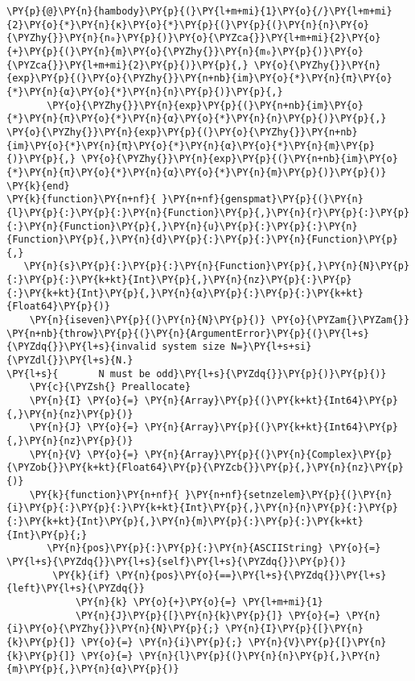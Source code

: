 \begin{Verbatim}[commandchars=\\\{\}]
    \PY{p}{@}\PY{n}{hambody}\PY{p}{(}\PY{l+m+mi}{1}\PY{o}{/}\PY{l+m+mi}{2}\PY{o}{*}\PY{n}{κ}\PY{o}{*}\PY{p}{(}\PY{p}{(}\PY{n}{n}\PY{o}{\PYZhy{}}\PY{n}{n₀}\PY{p}{)}\PY{o}{\PYZca{}}\PY{l+m+mi}{2}\PY{o}{+}\PY{p}{(}\PY{n}{m}\PY{o}{\PYZhy{}}\PY{n}{m₀}\PY{p}{)}\PY{o}{\PYZca{}}\PY{l+m+mi}{2}\PY{p}{)}\PY{p}{,} \PY{o}{\PYZhy{}}\PY{n}{exp}\PY{p}{(}\PY{o}{\PYZhy{}}\PY{n+nb}{im}\PY{o}{*}\PY{n}{π}\PY{o}{*}\PY{n}{α}\PY{o}{*}\PY{n}{n}\PY{p}{)}\PY{p}{,}
       \PY{o}{\PYZhy{}}\PY{n}{exp}\PY{p}{(}\PY{n+nb}{im}\PY{o}{*}\PY{n}{π}\PY{o}{*}\PY{n}{α}\PY{o}{*}\PY{n}{n}\PY{p}{)}\PY{p}{,} \PY{o}{\PYZhy{}}\PY{n}{exp}\PY{p}{(}\PY{o}{\PYZhy{}}\PY{n+nb}{im}\PY{o}{*}\PY{n}{π}\PY{o}{*}\PY{n}{α}\PY{o}{*}\PY{n}{m}\PY{p}{)}\PY{p}{,} \PY{o}{\PYZhy{}}\PY{n}{exp}\PY{p}{(}\PY{n+nb}{im}\PY{o}{*}\PY{n}{π}\PY{o}{*}\PY{n}{α}\PY{o}{*}\PY{n}{m}\PY{p}{)}\PY{p}{)}
\PY{k}{end}
\PY{k}{function}\PY{n+nf}{ }\PY{n+nf}{genspmat}\PY{p}{(}\PY{n}{l}\PY{p}{:}\PY{p}{:}\PY{n}{Function}\PY{p}{,}\PY{n}{r}\PY{p}{:}\PY{p}{:}\PY{n}{Function}\PY{p}{,}\PY{n}{u}\PY{p}{:}\PY{p}{:}\PY{n}{Function}\PY{p}{,}\PY{n}{d}\PY{p}{:}\PY{p}{:}\PY{n}{Function}\PY{p}{,}
   \PY{n}{s}\PY{p}{:}\PY{p}{:}\PY{n}{Function}\PY{p}{,}\PY{n}{N}\PY{p}{:}\PY{p}{:}\PY{k+kt}{Int}\PY{p}{,}\PY{n}{nz}\PY{p}{:}\PY{p}{:}\PY{k+kt}{Int}\PY{p}{,}\PY{n}{α}\PY{p}{:}\PY{p}{:}\PY{k+kt}{Float64}\PY{p}{)}
    \PY{n}{iseven}\PY{p}{(}\PY{n}{N}\PY{p}{)} \PY{o}{\PYZam{}\PYZam{}} \PY{n+nb}{throw}\PY{p}{(}\PY{n}{ArgumentError}\PY{p}{(}\PY{l+s}{\PYZdq{}}\PY{l+s}{invalid system size N=}\PY{l+s+si}{\PYZdl{}}\PY{l+s}{N.}
\PY{l+s}{       N must be odd}\PY{l+s}{\PYZdq{}}\PY{p}{)}\PY{p}{)}
    \PY{c}{\PYZsh{} Preallocate}
    \PY{n}{I} \PY{o}{=} \PY{n}{Array}\PY{p}{(}\PY{k+kt}{Int64}\PY{p}{,}\PY{n}{nz}\PY{p}{)}
    \PY{n}{J} \PY{o}{=} \PY{n}{Array}\PY{p}{(}\PY{k+kt}{Int64}\PY{p}{,}\PY{n}{nz}\PY{p}{)}
    \PY{n}{V} \PY{o}{=} \PY{n}{Array}\PY{p}{(}\PY{n}{Complex}\PY{p}{\PYZob{}}\PY{k+kt}{Float64}\PY{p}{\PYZcb{}}\PY{p}{,}\PY{n}{nz}\PY{p}{)}
    \PY{k}{function}\PY{n+nf}{ }\PY{n+nf}{setnzelem}\PY{p}{(}\PY{n}{i}\PY{p}{:}\PY{p}{:}\PY{k+kt}{Int}\PY{p}{,}\PY{n}{n}\PY{p}{:}\PY{p}{:}\PY{k+kt}{Int}\PY{p}{,}\PY{n}{m}\PY{p}{:}\PY{p}{:}\PY{k+kt}{Int}\PY{p}{;}
       \PY{n}{pos}\PY{p}{:}\PY{p}{:}\PY{n}{ASCIIString} \PY{o}{=} \PY{l+s}{\PYZdq{}}\PY{l+s}{self}\PY{l+s}{\PYZdq{}}\PY{p}{)}
        \PY{k}{if} \PY{n}{pos}\PY{o}{==}\PY{l+s}{\PYZdq{}}\PY{l+s}{left}\PY{l+s}{\PYZdq{}}
            \PY{n}{k} \PY{o}{+}\PY{o}{=} \PY{l+m+mi}{1}
            \PY{n}{J}\PY{p}{[}\PY{n}{k}\PY{p}{]} \PY{o}{=} \PY{n}{i}\PY{o}{\PYZhy{}}\PY{n}{N}\PY{p}{;} \PY{n}{I}\PY{p}{[}\PY{n}{k}\PY{p}{]} \PY{o}{=} \PY{n}{i}\PY{p}{;} \PY{n}{V}\PY{p}{[}\PY{n}{k}\PY{p}{]} \PY{o}{=} \PY{n}{l}\PY{p}{(}\PY{n}{n}\PY{p}{,}\PY{n}{m}\PY{p}{,}\PY{n}{α}\PY{p}{)}

\end{Verbatim}
